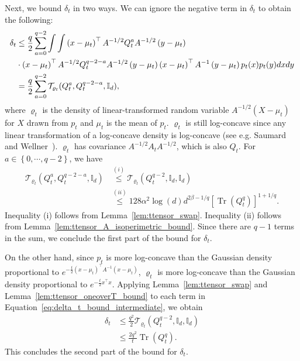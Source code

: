 \documentclass[11pt,twoside]{article}
\newcommand{\denb}{\varrho}
\newcommand{\ttensor}{\mathcal{T}}
\newcommand{\co}{A}
\newcommand{\qo}{Q}
\theoremstyle{named}
\theoremstyle{plain}
\newcommand{\usedim}{\ensuremath{d}}
\newcommand{\dims}{\usedim}
\DeclareMathOperator{\trace}{Tr}
\newcommand{\Ind}{\ensuremath{\mathbb{I}}}
\newcommand{\brackets}[1]{\left[ #1 \right]}
\newcommand{\parenth}[1]{\left( #1 \right)}
\newcommand{\braces}[1]{\left\{ #1 \right \}}
\newcommand{\tp}{^\top}
\begin{document}
Next, we bound $\delta_t$ in two ways. We can ignore the negative term in $\delta_t$ to obtain the following:
\begin{align}
  \label{eq:delta_t_bound_intermediate}
  \delta_t &\leq \frac{q}{2} \sum_{a = 0}^{q-2} \int \int \parenth{x-\mu_t}\tp \co^{-1/2} \qo_t^{a} \co^{-1/2} \parenth{y-\mu_t} \notag \\
  &\cdot \parenth{x-\mu_t}\tp \co^{-1/2} \qo_t^{q-2-a} \co^{-1/2} \parenth{y-\mu_t} \parenth{x-\mu_t}\tp \co^{-1} \parenth{y-\mu_t} p_t(x) p_t(y) dx dy \notag \\
  &= \frac{q}{2} \sum_{a = 0}^{q-2} \ttensor_{\denb_t}(Q_t^{a}, Q_t^{q-2-a}, \Ind_\dims),
\end{align}
where $\denb_t$ is the density of linear-transformed random variable $\co^{-1/2}\parenth{X-\mu_t}$ for $X$ drawn from $p_t$ and $\mu_t$ is the mean of $p_t$. $\denb_t$ is still log-concave since any linear transformation of a log-concave density is log-concave (see e.g. Saumard and Wellner~\cite{saumard2014log}). $\denb_t$ has covariance $\co^{-1/2} A_t \co^{-1/2}$, which is also $Q_t$. For $a \in \braces{0, \cdots, q-2}$, we have
\begin{align*}
  \ttensor_{\denb_t}(\qo_t^{a}, \qo_t^{q-2-a}, \Ind_\dims) &\stackrel{(i)}{\leq} \ttensor_{\denb_t}(\qo_t^{q-2}, \Ind_\dims, \Ind_\dims) \\
  &\stackrel{(ii)}{\leq} 128 \alpha^2 \log(\dims) \dims^{2\beta - 1/q} \brackets{\trace\parenth{\qo_t^q}}^{1+1/q}.
\end{align*}
Inequality (i) follows from Lemma~\ref{lem:ttensor_swap}. Inequality (ii) follows from Lemma~\ref{lem:ttensor_A_isoperimetric_bound}. Since there are $q-1$ terms in the sum, we conclude the first part of the bound for $\delta_t$.

On the other hand, since $p_t$ is more log-concave than the Gaussian density proportional to $e^{-\frac{t}{2} (x-\mu_t)\tp \co^{-1} (x-\mu_t)}$, $\denb_t$ is more log-concave than the Gaussian density proportional to $e^{-\frac{t}{2} x\tp x}$. Applying Lemma~\ref{lem:ttensor_swap} and Lemma~\ref{lem:ttensor_oneoverT_bound} to each term in Equation~\eqref{eq:delta_t_bound_intermediate}, we obtain
\begin{align*}
  \delta_t &\leq \frac{q^2}{2} \ttensor_{\denb_t}(\qo_t^{q-2}, \Ind_\dims, \Ind_\dims) \\
  &\leq \frac{2q^2}{t} \trace\parenth{\qo_t^{q}}.
\end{align*}
This concludes the second part of the bound for $\delta_t$.
\end{document}
